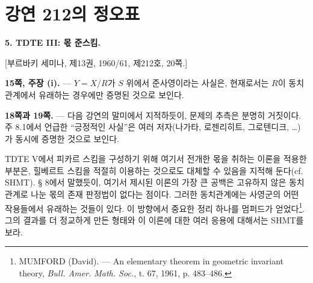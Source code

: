 \clearpage
\chapter*{강연 212의 정오표}
\setcounter{footnote}{2}

\noindent\textbf{5. TDTE III: 몫 준스킴.}

\begin{center}
[부르바키 세미나, 제13권, 1960/61, 제212호, 20쪽.]
\end{center}

\noindent\textbf{15쪽, 주장 (i).} --- $Y=X/R$가 $S$ 위에서
준사영이라는 사실은, 현재로서는 $R$이 동치관계에서 유래하는 경우에만
증명된 것으로 보인다.

\noindent\textbf{18쪽과 19쪽.} --- 다음 강연의 말미에서 지적하듯이,
문제의 추측은 분명히 거짓이다. 주 8.1에서 언급한 ``긍정적인 사실''은
여러 저자(나가타, 로젠리히트, 그로텐디크, \ldots)가 동시에 증명한 것으로
보인다.

TDTE V에서 피카르 스킴을 구성하기 위해 여기서 전개한 몫을 취하는 이론을
적용한 부분은, 힐베르트 스킴을 적절히 이용하는 것으로도 대체할 수 있음을
지적해 둔다(cf. SHMT). § 8에서 말했듯이, 여기서 제시된
이론의 가장 큰 공백은 고유하지 않은 동치관계로 나눈 몫의 존재 판정법이
없다는 점이다. 그러한 동치관계에는 사영군의 어떤 작용들에서 유래하는
것들이 있다. 이 방향에서 중요한 정리 하나를 멈퍼드가 얻었다\footnote{MUMFORD
(David). --- An elementary theorem in geometric invariant theory, \emph{Bull.
Amer. Math. Soc.}, t. 67, 1961, p. 483--486.}. 그의 결과를 더 정교하게 만든
형태와 이 이론에 대한 여러 응용에 대해서는 SHMT를 보라.
